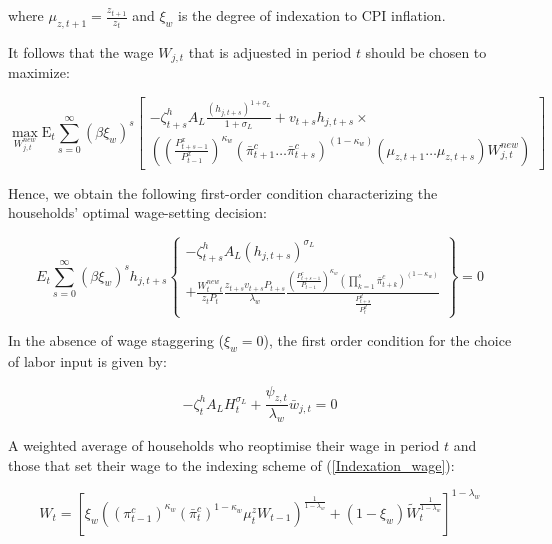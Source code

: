 \documentclass[12pt,oneside,a4paper]{article}
\begin{document}
where $ \mu_{z, t+1}=\frac{z_{t+1}}{z_{t}}$ and $\xi_w$ is the degree of indexation to CPI inflation.

It follows that the wage $W_{j,t}$ that is adjuested in period $t$ should be chosen to maximize:

\begin{equation}
\max _{W_{j, t}^{n e w}} \mathrm{E}_{t} \sum_{s=0}^{\infty}\left(\beta \xi_{w}\right)^{s}\left[\begin{array}{c}
-\zeta_{t+s}^{h} A_{L} \frac{\left(h_{j, t+s}\right)^{1+\sigma_{L}}}{1+\sigma_{L}}+v_{t+s} h_{j, t+s} \times \\
\left(\left(\frac{P_{t+s-1}^{x}}{P_{t-1}^{x}}\right)^{\kappa_{w}} \left(\bar{\pi}_{t+1}^{c} \ldots \bar{\pi}_{t+s}^{c}\right)^{\left(1-\kappa_{w}\right)}\left(\mu_{z, t+1} \ldots \mu_{z, t+s}\right) W_{j, t}^{n e w}\right) 
\end{array}\right]
\end{equation}

Hence, we obtain the following first-order condition characterizing the households’ optimal wage-setting decision:

\begin{equation}
    E_{t} \sum_{s=0}^{\infty}\left(\beta \xi_{w}\right)^{s} h_{j, t+s}\left\{\begin{array}{c} -\zeta_{t+s}^{h} A_{L}\left(h_{j, t+s}\right)^{\sigma_{L}} \\ +\frac{W_{t}^{new}_{t}}{z_{t} P_{t}} \frac{z_{t+s} v_{t+s} P_{t+s}}{\lambda_{w}} \frac{\left(\frac{P_{t+s-1}^{c}}{P_{t-1}}\right)^{\kappa_{w}}\left(\prod_{k=1}^{s} \bar{\pi}_{t+k}^{c}\right)^{\left(1-\kappa_{w}\right)}}{\frac{P_{t+s}^{d}}{P_{t}^{d}}}\end{array}\right\}=0
\end{equation}

In the absence of wage staggering ($\xi_w = 0$), the first order condition for the choice of labor input is given by:

\begin{equation}
    -\zeta_t^{h}A_{L}H_{t}^{\sigma_L} + \frac{\psi_{z,t}}{\lambda_w}\bar{w}_{j,t} = 0
\end{equation}

A weighted average of households who reoptimise their wage in period $t$ and those that set their wage to the indexing scheme of (\ref{Indexation_wage}): 

\begin{equation}
W_{t}=\left[\xi_{w}\left(\left(\pi_{t-1}^{c}\right)^{\kappa_{w}}\left(\bar{\pi}_{t}^{c}\right)^{1-\kappa_{w}} \mu_{t}^{z} W_{t-1}\right)^{\frac{1}{1-\lambda_{w}}}+\left(1-\xi_{w}\right) \tilde{W}_{t}^{\frac{1}{1-\lambda_{w}}}\right]^{1-\lambda_{w}}
\end{equation}
\end{document}
